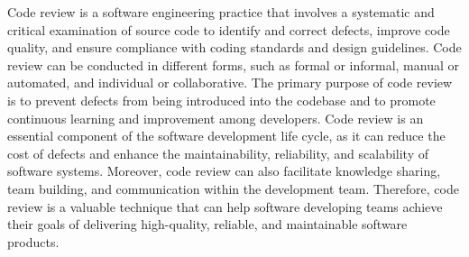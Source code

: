 Code review is a software engineering practice that involves a systematic and critical examination of source code to identify and correct defects, improve code quality, and ensure compliance with coding standards and design guidelines. \cite{atlassian_code_review} Code review can be conducted in different forms, such as formal or informal, manual or automated, and individual or collaborative. The primary purpose of code review is to prevent defects from being introduced into the codebase and to promote continuous learning and improvement among developers. Code review is an essential component of the software development life cycle, as it can reduce the cost of defects and enhance the maintainability, reliability, and scalability of software systems. Moreover, code review can also facilitate knowledge sharing, team building, and communication within the development team. \cite{springboard_code_review_checklist} Therefore, code review is a valuable technique that can help software developing teams achieve their goals of delivering high-quality, reliable, and maintainable software products.

